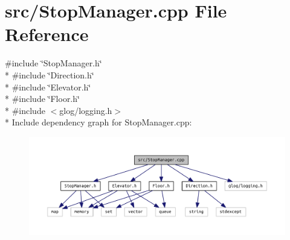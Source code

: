 \section{src/\+Stop\+Manager.cpp File Reference}
\label{_stop_manager_8cpp}
{\ttfamily \#include \char`\"{}Stop\+Manager.\+h\char`\"{}}\\*
{\ttfamily \#include \char`\"{}Direction.\+h\char`\"{}}\\*
{\ttfamily \#include \char`\"{}Elevator.\+h\char`\"{}}\\*
{\ttfamily \#include \char`\"{}Floor.\+h\char`\"{}}\\*
{\ttfamily \#include $<$glog/logging.\+h$>$}\\*
Include dependency graph for Stop\+Manager.\+cpp\+:\nopagebreak
\begin{figure}[H]
\begin{center}
\leavevmode
\includegraphics[width=350pt]{_stop_manager_8cpp__incl}
\end{center}
\end{figure}
